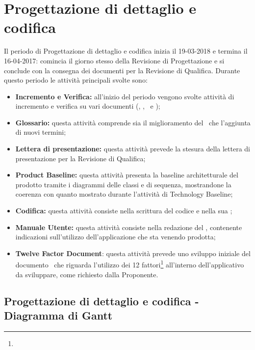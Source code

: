 \documentclass[PianoDiProgetto.tex]{subfiles}
\begin{document}
\section{Progettazione di dettaglio e codifica}
Il periodo di Progettazione di dettaglio e codifica inizia il 19-03-2018 e termina il 16-04-2017: comincia il giorno stesso della Revisione di Progettazione e si conclude con la consegna dei documenti per la Revisione di Qualifica. Durante questo periodo le attività principali svolte sono:
\begin{itemize}
	\item \textbf{Incremento e Verifica:} all'inizio del periodo vengono svolte attività di incremento e verifica su vari documenti (\ndp, \pdp, \pdq\ e \tb);
	\item \textbf{Glossario:} questa attività comprende sia il miglioramento del \g\ che l'aggiunta di nuovi termini;
	\item \textbf{Lettera di presentazione:} questa attività prevede la stesura della lettera di presentazione per la Revisione di Qualifica;
	\item \textbf{Product Baseline:} questa attività presenta la baseline architetturale del prodotto tramite i  diagrammi delle classi e di sequenza, mostrandone la coerenza con quanto mostrato durante l'attività di Technology Baseline;
	\item \textbf{Codifica:} questa attività consiste nella scrittura del codice e nella sua ;
	\item \textbf{Manuale Utente:} questa attività consiste nella redazione del \mut, contenente indicazioni sull’utilizzo dell'applicazione che sta venendo prodotta;
	\item \textbf{Twelve Factor Document}: questa attività prevede uno sviluppo iniziale del documento \tfd\ che riguarda l'utilizzo dei 12 fattori\footnote{} all'interno dell'applicativo da sviluppare, come richiesto dalla Proponente.
\end{itemize}
\begin{landscape}
		\subsection{Progettazione di dettaglio e codifica - Diagramma di Gantt}
\end{landscape}
\end{document}

